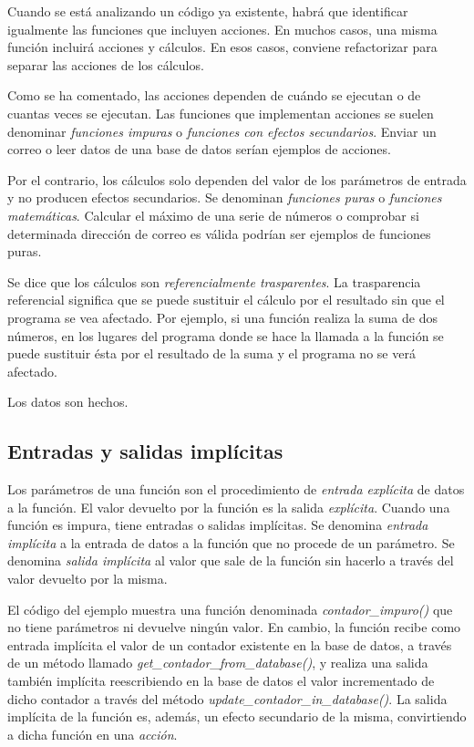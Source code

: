 \documentclass[a4paper,11pt]{extarticle}
\begin{document}
Cuando se está analizando un código ya existente, habrá que identificar igualmente las funciones que incluyen acciones. En muchos casos, una misma función incluirá acciones y cálculos. En esos casos, conviene refactorizar para separar las acciones de los cálculos.  

Como se ha comentado, las acciones dependen de cuándo se ejecutan o de cuantas veces se ejecutan. Las funciones que implementan acciones se suelen denominar \textit{funciones impuras} o \textit{funciones con efectos secundarios}. Enviar un correo o leer datos de una base de datos serían ejemplos de acciones.

Por el contrario, los cálculos solo dependen del valor de los parámetros de entrada y no producen efectos secundarios. Se denominan \textit{funciones puras} o \textit{funciones matemáticas}. Calcular el máximo de una serie de números o comprobar si determinada dirección de correo es válida podrían ser ejemplos de funciones puras. 

Se dice que los cálculos son \textit{referencialmente trasparentes}. La trasparencia referencial significa que se puede sustituir el cálculo por el resultado sin que el programa se vea afectado. Por ejemplo, si una función realiza la suma de dos números, en los lugares del programa donde se hace la llamada a la función se puede sustituir ésta por el resultado de la suma y el programa no se verá afectado.

Los datos son hechos.

\subsection{Entradas y salidas implícitas}
Los parámetros de una función son el procedimiento de \textit{entrada explícita} de datos a la función. El valor devuelto por la función es la salida \textit{explícita}. 
Cuando una función es impura, tiene entradas o salidas implícitas. Se denomina \textit{entrada implícita} a la entrada de datos a la función que no procede de un parámetro. Se denomina \textit{salida implícita} al valor que sale de la función sin hacerlo a través del valor devuelto por la misma.

El código del ejemplo muestra una función denominada \textit{contador\_impuro()} que no tiene parámetros ni devuelve ningún valor. En cambio, la función recibe como entrada implícita el valor de un contador existente en la base de datos, a través de un método llamado \textit{get\_contador\_from\_database()}, y realiza una salida también implícita reescribiendo en la base de datos el valor incrementado de dicho contador a través del método \textit{update\_contador\_in\_database()}. La salida implícita de la función es, además, un efecto secundario de la misma, convirtiendo a dicha función en una \textit{acción}.
\end{document}
